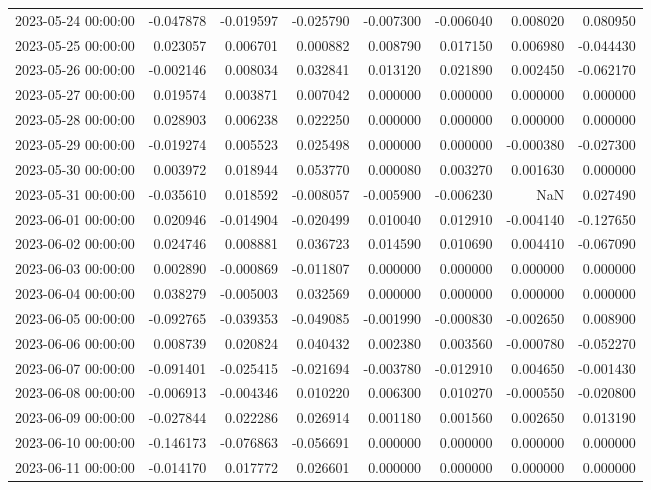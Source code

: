 \begin{tabular}{lrrrrrrr}
2023-05-24 00:00:00 & -0.047878 & -0.019597 & -0.025790 & -0.007300 & -0.006040 & 0.008020 & 0.080950 \\
2023-05-25 00:00:00 & 0.023057 & 0.006701 & 0.000882 & 0.008790 & 0.017150 & 0.006980 & -0.044430 \\
2023-05-26 00:00:00 & -0.002146 & 0.008034 & 0.032841 & 0.013120 & 0.021890 & 0.002450 & -0.062170 \\
2023-05-27 00:00:00 & 0.019574 & 0.003871 & 0.007042 & 0.000000 & 0.000000 & 0.000000 & 0.000000 \\
2023-05-28 00:00:00 & 0.028903 & 0.006238 & 0.022250 & 0.000000 & 0.000000 & 0.000000 & 0.000000 \\
2023-05-29 00:00:00 & -0.019274 & 0.005523 & 0.025498 & 0.000000 & 0.000000 & -0.000380 & -0.027300 \\
2023-05-30 00:00:00 & 0.003972 & 0.018944 & 0.053770 & 0.000080 & 0.003270 & 0.001630 & 0.000000 \\
2023-05-31 00:00:00 & -0.035610 & 0.018592 & -0.008057 & -0.005900 & -0.006230 & NaN & 0.027490 \\
2023-06-01 00:00:00 & 0.020946 & -0.014904 & -0.020499 & 0.010040 & 0.012910 & -0.004140 & -0.127650 \\
2023-06-02 00:00:00 & 0.024746 & 0.008881 & 0.036723 & 0.014590 & 0.010690 & 0.004410 & -0.067090 \\
2023-06-03 00:00:00 & 0.002890 & -0.000869 & -0.011807 & 0.000000 & 0.000000 & 0.000000 & 0.000000 \\
2023-06-04 00:00:00 & 0.038279 & -0.005003 & 0.032569 & 0.000000 & 0.000000 & 0.000000 & 0.000000 \\
2023-06-05 00:00:00 & -0.092765 & -0.039353 & -0.049085 & -0.001990 & -0.000830 & -0.002650 & 0.008900 \\
2023-06-06 00:00:00 & 0.008739 & 0.020824 & 0.040432 & 0.002380 & 0.003560 & -0.000780 & -0.052270 \\
2023-06-07 00:00:00 & -0.091401 & -0.025415 & -0.021694 & -0.003780 & -0.012910 & 0.004650 & -0.001430 \\
2023-06-08 00:00:00 & -0.006913 & -0.004346 & 0.010220 & 0.006300 & 0.010270 & -0.000550 & -0.020800 \\
2023-06-09 00:00:00 & -0.027844 & 0.022286 & 0.026914 & 0.001180 & 0.001560 & 0.002650 & 0.013190 \\
2023-06-10 00:00:00 & -0.146173 & -0.076863 & -0.056691 & 0.000000 & 0.000000 & 0.000000 & 0.000000 \\
2023-06-11 00:00:00 & -0.014170 & 0.017772 & 0.026601 & 0.000000 & 0.000000 & 0.000000 & 0.000000 \\

\end{tabular}
